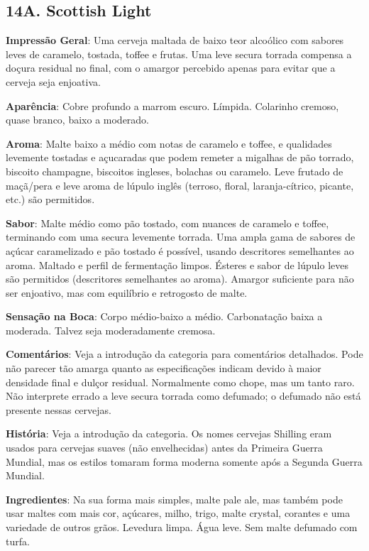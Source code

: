 \subsection*{14A. Scottish Light}

\textbf{Impressão Geral}: Uma cerveja maltada de baixo teor alcoólico com sabores leves de caramelo, tostada, toffee e frutas. Uma leve secura torrada compensa a doçura residual no final, com o amargor percebido apenas para evitar que a cerveja seja enjoativa.

\textbf{Aparência}: Cobre profundo a marrom escuro. Límpida. Colarinho cremoso, quase branco, baixo a moderado.

\textbf{Aroma}: Malte baixo a médio com notas de caramelo e toffee, e qualidades levemente tostadas e açucaradas que podem remeter a migalhas de pão torrado, biscoito champagne, biscoitos ingleses, bolachas ou caramelo. Leve frutado de maçã/pera e leve aroma de lúpulo inglês (terroso, floral, laranja-cítrico, picante, etc.) são permitidos.

\textbf{Sabor}: Malte médio como pão tostado, com nuances de caramelo e toffee, terminando com uma secura levemente torrada. Uma ampla gama de sabores de açúcar caramelizado e pão tostado é possível, usando descritores semelhantes ao aroma. Maltado e perfil de fermentação limpos. Ésteres e sabor de lúpulo leves são permitidos (descritores semelhantes ao aroma). Amargor suficiente para não ser enjoativo, mas com equilíbrio e retrogosto de malte.

\textbf{Sensação na Boca}: Corpo médio-baixo a médio. Carbonatação baixa a moderada. Talvez seja moderadamente cremosa.

\textbf{Comentários}: Veja a introdução da categoria para comentários detalhados. Pode não parecer tão amarga quanto as especificações indicam devido à maior densidade final e dulçor residual. Normalmente como chope, mas um tanto raro. Não interprete errado a leve secura torrada como defumado; o defumado não está presente nessas cervejas.

\textbf{História}: Veja a introdução da categoria. Os nomes cervejas Shilling eram usados para cervejas suaves (não envelhecidas) antes da Primeira Guerra Mundial, mas os estilos tomaram forma moderna somente após a Segunda Guerra Mundial.

\textbf{Ingredientes}: Na sua forma mais simples, malte pale ale, mas também pode usar maltes com mais cor, açúcares, milho, trigo, malte crystal, corantes e uma variedade de outros grãos. Levedura limpa. Água leve. Sem malte defumado com turfa.

